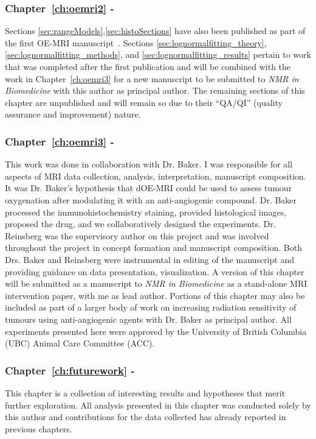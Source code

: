 \subsubsection{Chapter~\ref{ch:oemri2} - }
Sections \ref{sec:rangeModels},\ref{sec:histoSections} have also been published as part of the first OE-MRI manuscript~\cite{Moosvi:2018ca}.
Sections \ref{sec:lognormalfitting_theory}, \ref{sec:lognormalfitting_methods}, and \ref{sec:lognormalfitting_results} pertain to work that was completed after the first publication and will be combined with the work in Chapter~\ref{ch:oemri3} for a new manuscript to be submitted to \textit{NMR in Biomedicine} with this author as principal author.
The remaining sections of this chapter are unpublished and will remain so due to their ``QA/QI'' (quality assurance and improvement) nature.

\subsubsection{Chapter~\ref{ch:oemri3} - }

This work was done in collaboration with Dr. Baker.
I was responsible for all aspects of MRI data collection, analysis, interpretation, manuscript composition. 
It was Dr. Baker's hypothesis that \acs{dOE-MRI} could be used to assess tumour oxygenation after modulating it with an anti-angiogenic compound. 
Dr. Baker processed the immunohistochemistry staining, provided histological images, proposed the drug, and we collaboratively designed the experiments. 
Dr. Reinsberg was the supervisory author on this project and was involved throughout the project in concept formation and manuscript composition. 
Both Drs. Baker and Reinsberg were instrumental in editing of the manuscript and providing guidance on data presentation, visualization.
A version of this chapter will be submitted as a manuscript to \textit{NMR in Biomedicine} as a stand-alone MRI intervention paper, with me as lead author.
Portions of this chapter may also be included as part of a larger body of work on increasing radiation sensitivity of tumours using anti-angiogenic agents with Dr. Baker as principal author.
All experiments presented here were approved by the University of British Columbia (UBC) Animal Care Committee (ACC).

\subsubsection{Chapter~\ref{ch:futurework} - }

This chapter is a collection of interesting results and hypotheses that merit further exploration.
All analysis presented in this chapter was conducted solely by this author and contributions for the data collected has already reported in previous chapters.
